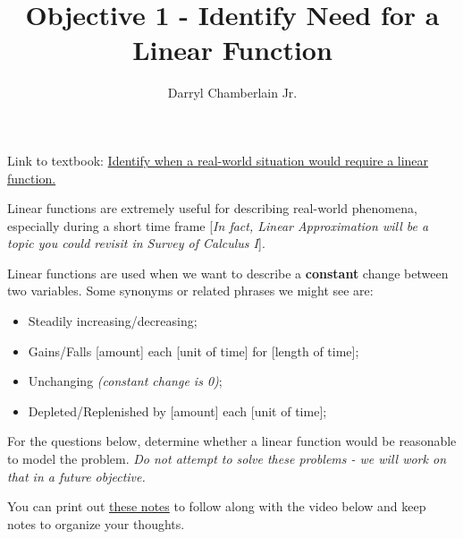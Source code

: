 \documentclass{ximera}
\author{Darryl Chamberlain Jr.}
\title{Objective 1 - Identify Need for a Linear Function}
\begin{document}
\begin{abstract}

\end{abstract}

\maketitle
 
Link to textbook: 
\href{https://cnx.org/contents/mwjClAV_@8.12:3PeE3KzR@10/Modeling-with-Linear-Functions}{Identify when a real-world situation would require a linear function.}
 

Linear functions are extremely useful for describing real-world phenomena, especially during a short time frame [\textit{In fact, Linear Approximation will be a topic you could revisit in Survey of Calculus I}]. 

Linear functions are used when we want to describe a \textbf{constant} change between two variables. Some synonyms or related phrases we might see are:
	\begin{itemize}
		\item Steadily increasing/decreasing;
		\item Gains/Falls [amount] each [unit of time] for [length of time];
		\item Unchanging \textit{(constant change is 0)};
		\item Depleted/Replenished by [amount] each [unit of time];
	\end{itemize}

For the questions below, determine whether a linear function would be reasonable to model the problem. \textit{Do not attempt to solve these problems - we will work on that in a future objective.} 

You can print out \href{http://people.clas.ufl.edu/dchamberlain31/files/M9M-Objective-2-Identify-Domain-of-Model.pdf}{these notes} to follow along with the video below and keep notes to organize your thoughts.

\end{document}
